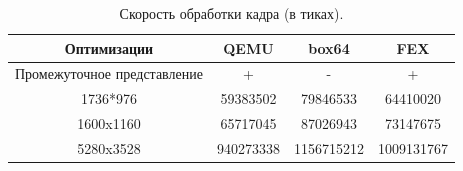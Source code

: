 \begin{table}[h]
	\begin{center}
		\label{tbl:small}
		\caption{Скорость обработки кадра (в тиках).}
			\begin{tabular}{|c|c|c|c|}
				\hline
				\bfseries Оптимизации & \bfseries QEMU & \bfseries box64 & \bfseries FEX  \\
				\hline
				Промежуточное представление & + & - & + \\ \hline
				1736*976 & 59383502 & 79846533 & 64410020 \\ \hline
				1600x1160 & 65717045 & 87026943 & 73147675 \\ \hline
				5280x3528 & 940273338 & 1156715212 & 1009131767 \\ \hline
		\end{tabular}
	\end{center}
\end{table}

